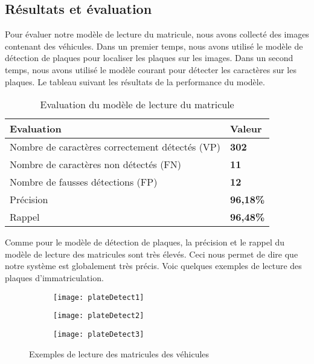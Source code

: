     \subsection{Résultats et évaluation}
    Pour évaluer notre modèle de lecture du matricule, nous avons collecté des images contenant des véhicules. Dans un premier temps, nous avons utilisé le modèle de détection de plaques pour localiser les plaques sur les images. Dans un second temps, nous avons utilisé le modèle courant pour détecter les caractères sur les plaques. Le tableau suivant les résultats de la performance du modèle.
    \begin{table}[H]
        \centering
        \begin{tabular}{|l|l|}
            \hline
            \rowcolor{Gray}
            \textbf{Evaluation} & \textbf{Valeur} \\ \hline
            Nombre de caractères correctement détectés (VP) & \textbf{302} \\ \hline
            Nombre de caractères non détectés (FN) & \textbf{11} \\ \hline
            Nombre de fausses détections (FP) & \textbf{12} \\ \hline
            Précision & \textbf{96,18\%} \\ \hline
            Rappel & \textbf{96,48\%} \\ \hline
        \end{tabular}
        \caption{Evaluation du modèle de lecture du matricule}
    \end{table}
    Comme pour le modèle de détection de plaques, la précision et le rappel du modèle de lecture des matricules sont très élevés. Ceci nous permet de dire que notre système est globalement très précis. Voic quelques exemples de lecture des plaques d'immatriculation.
    \begin{figure}[H]
        \begin{subfigure}{0.3\textwidth}
            \centering
            \texttt{[image: plateDetect1]}
        \end{subfigure}
        \hfill
        \begin{subfigure}{0.3\textwidth}
            \centering
            \texttt{[image: plateDetect2]}
        \end{subfigure}
        \hfill
        \begin{subfigure}{0.3\textwidth}
            \centering
            \texttt{[image: plateDetect3]}
        \end{subfigure}
        \caption{Exemples de lecture des matricules des véhicules}
    \end{figure}
